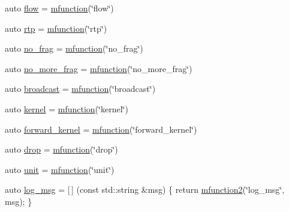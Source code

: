 \begin{DoxyCompactItemize}
auto \hyperlink{namespacepfq__lang_1_1anonymous__namespace_02default_8hpp_03_a90497b962aed613834286418cd7ea722}{flow} = \hyperlink{namespacepfq__lang_a47d60e7fc6df739692308276b8f6d4e4}{mfunction}(\char`\"{}flow\char`\"{})
\item 
auto \hyperlink{namespacepfq__lang_1_1anonymous__namespace_02default_8hpp_03_a13ac072f4d7f860256ef22d7f5a1a9ac}{rtp} = \hyperlink{namespacepfq__lang_a47d60e7fc6df739692308276b8f6d4e4}{mfunction}(\char`\"{}rtp\char`\"{})
\item 
auto \hyperlink{namespacepfq__lang_1_1anonymous__namespace_02default_8hpp_03_a60b130b2b5a08d0c83063ed584b79396}{no\+\_\+frag} = \hyperlink{namespacepfq__lang_a47d60e7fc6df739692308276b8f6d4e4}{mfunction}(\char`\"{}no\+\_\+frag\char`\"{})
\item 
auto \hyperlink{namespacepfq__lang_1_1anonymous__namespace_02default_8hpp_03_ac400453f07ca5fc4ef28d20085f149c2}{no\+\_\+more\+\_\+frag} = \hyperlink{namespacepfq__lang_a47d60e7fc6df739692308276b8f6d4e4}{mfunction}(\char`\"{}no\+\_\+more\+\_\+frag\char`\"{})
\item 
auto \hyperlink{namespacepfq__lang_1_1anonymous__namespace_02default_8hpp_03_a3b7dd001dfb2302c93212313c0bfa82a}{broadcast} = \hyperlink{namespacepfq__lang_a47d60e7fc6df739692308276b8f6d4e4}{mfunction}(\char`\"{}broadcast\char`\"{})
\item 
auto \hyperlink{namespacepfq__lang_1_1anonymous__namespace_02default_8hpp_03_a68a2502f951a2b671a7d0496609f5d2a}{kernel} = \hyperlink{namespacepfq__lang_a47d60e7fc6df739692308276b8f6d4e4}{mfunction}(\char`\"{}kernel\char`\"{})
\item 
auto \hyperlink{namespacepfq__lang_1_1anonymous__namespace_02default_8hpp_03_a453450a8ebf5660ab590a3ffb79057e1}{forward\+\_\+kernel} = \hyperlink{namespacepfq__lang_a47d60e7fc6df739692308276b8f6d4e4}{mfunction}(\char`\"{}forward\+\_\+kernel\char`\"{})
\item 
auto \hyperlink{namespacepfq__lang_1_1anonymous__namespace_02default_8hpp_03_abed0412f2864624f755594077d255b1e}{drop} = \hyperlink{namespacepfq__lang_a47d60e7fc6df739692308276b8f6d4e4}{mfunction}(\char`\"{}drop\char`\"{})
\item 
auto \hyperlink{namespacepfq__lang_1_1anonymous__namespace_02default_8hpp_03_ae78caafebdc64f9180032a049b7c3b3a}{unit} = \hyperlink{namespacepfq__lang_a47d60e7fc6df739692308276b8f6d4e4}{mfunction}(\char`\"{}unit\char`\"{})
\item 
auto \hyperlink{namespacepfq__lang_1_1anonymous__namespace_02default_8hpp_03_a6e8f4a76ce585b69d5de50cfa6a08f8a}{log\+\_\+msg} = \mbox{[}$\,$\mbox{]} (const std\+::string \&msg) \{ return \hyperlink{namespacepfq__lang_aa817867af6f06d681a8c1a6d3b3bdd50}{mfunction2}(\char`\"{}log\+\_\+msg\char`\"{}, msg); \}

\end{DoxyCompactItemize}
